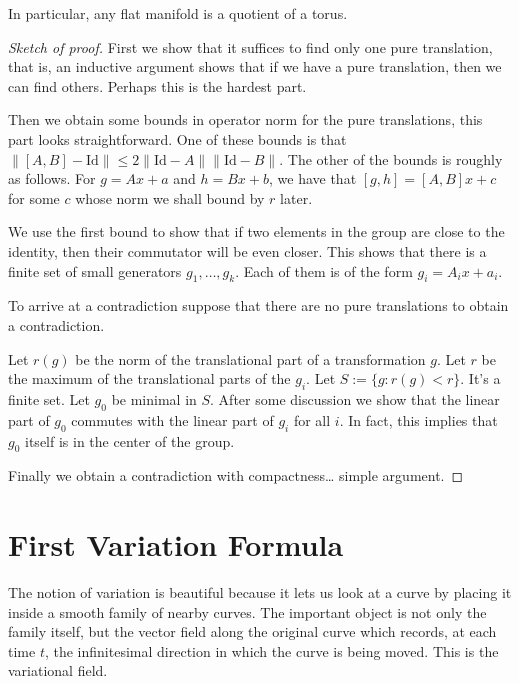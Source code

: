 \documentclass{book}
\begin{document}
\begin{theorem}[Bieberbach]
\label{theorem-Bieberbach}
In particular, any flat manifold is a
quotient of a torus.
\end{theorem}

\begin{proof}[Sketch of proof]
First we show that it suffices to find only
one pure translation, that is, an
inductive argument shows that if we have a
pure translation, then we can find
others. Perhaps this is the hardest part.

Then we obtain some bounds in operator norm
for the pure translations, this part
looks straightforward.  One of these bounds
is that $\|[A,B]-\text{Id}\|\leq
2\|\text{Id}-A\|\|\text{Id}-B\|$. The other
of the bounds is roughly as follows.
For $g=Ax+a$ and $h=Bx+b$, we have that
$[g,h]=[A,B]x+c$ for some $c$ whose norm
we shall bound by $r$ later.

We use the first bound to show that if two
elements in the group are close to
the identity, then their commutator will be
even closer. This shows that there
is a finite set of small generators
$g_1,\ldots,g_k$. Each of them is of the
form $g_i=A_ix+a_i$.

To arrive at a contradiction suppose that
there are no pure translations to
obtain a contradiction.

Let $r(g)$ be the norm of the translational
part of a transformation $g$. Let
$r$ be the maximum of the translational parts
of the $g_i$.
Let $S:=\{g:r(g)<r\}$. It's a finite set. Let
$g_0$ be minimal in $S$. After
some discussion we show that the linear part
of $g_0$ commutes with the linear
part of $g_i$ for all $i$. In fact, this
implies that $g_0$ itself is in the
center of the group.

Finally we obtain a contradiction with
compactness… simple argument.
\end{proof}

\section{First Variation Formula}
\label{section-first-variation}

\noindent
The notion of variation is beautiful because
it lets us look at a curve by placing it
inside a smooth family of nearby curves. The
important object is not only the family
itself, but the vector field along the
original curve which records, at each time
$t$, the infinitesimal direction in which the
curve is being moved. This is the
variational field.
\end{document}
